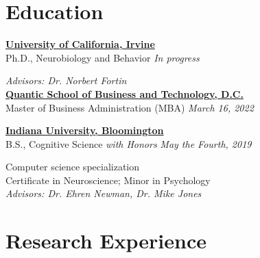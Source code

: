 \documentclass[10pt]{cooperCV2}
\begin{document}

\section{Education} 

  

\href{http://www.iu.edu/}{\textbf{University of California, Irvine}} \\
 Ph.D., Neurobiology and Behavior \hfill \textit{In progress}



 \textit{Advisors: Dr. Norbert Fortin}\\ 

  

\href{http://www.iu.edu/}{\textbf{Quantic School of Business and Technology, D.C.}} \\
 Master of Business Administration (MBA) \hfill \textit{March 16, 2022}



 \null \hfil 

  

\href{http://www.iu.edu/}{\textbf{Indiana University, Bloomington}} \\
 B.S., Cognitive Science \textit{with Honors} \hfill \textit{May the Fourth, 2019}

 Computer science specialization \\ 
 Certificate in Neuroscience; Minor in Psychology\\  
 \textit{Advisors: Dr. Ehren Newman, Dr. Mike Jones}\\ 








%	






\section{Research Experience}
\needspace{4em}
\bigskip
\end{document}
